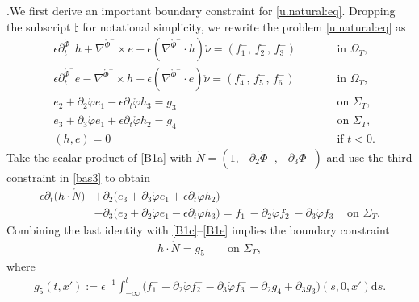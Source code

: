 \documentclass[twoside,11pt]{article}
\numberwithin{equation}{section}
\def\p{\partial}
\begin{document}
\vspace*{2mm}
.\quad We first derive an important boundary constraint for \eqref{u.natural:eq}.
Dropping the subscript $\natural$ for notational simplicity,
we rewrite the problem \eqref{u.natural:eq} as
\begin{subequations} \label{B1}
	\begin{alignat}{3}
		\label{B1a}
		&\epsilon \p_t^{\mathring{\Phi}^-}h+\nabla^{\mathring{\Phi}^-}\times e+\epsilon   (\nabla^{\mathring{\Phi}^-}\cdot h) \mathring{\nu}= (f_1^-,\, f_2^-,\, f_3^-)
		&\qquad &  \textrm{in } \Omega_T,\\[0.5mm]
		\label{B1b}
		& \epsilon \p_t^{\mathring{\Phi}^-}e-\nabla^{\mathring{\Phi}^-}\times h+\epsilon  ( \nabla^{\mathring{\Phi}^-}\cdot e )\mathring{\nu}=(f_4^-,\, f_5^-,\, f_6^-)
		&& \textrm{in }\Omega_T,\\[0.5mm]
		\label{B1c}
	& e_2+\p_2\mathring{\varphi}e_1-\epsilon \p_t\mathring{\varphi} h_3=g_3
&\quad  &\textrm{on } \Sigma_T,\\[0.5mm]
		\label{B1d}
& e_3+\p_3\mathring{\varphi}e_1+\epsilon \p_t\mathring{\varphi} h_2=g_4
&\quad  &\textrm{on } \Sigma_T,\\[0.5mm]
		\label{B1e}
		&
		(h, e) =0   &&\textrm{if } t<0.
	\end{alignat}
\end{subequations}
Take the scalar product of \eqref{B1a} with $\mathring{N}=(1,-\p_2\mathring{\Phi}^-,-\p_3\mathring{\Phi}^-)$
and use the third constraint in \eqref{bas3} to obtain
\begin{align}\nonumber
\epsilon \p_t\big(h\cdot \mathring{N}\big)
&	+\p_2\big(e_3 +\p_3\mathring{\varphi}e_1+\epsilon \p_t\mathring{\varphi} h_2\big)
\\[0.5mm]
&	-\p_3\big(e_2+\p_2\mathring{\varphi}e_1-\epsilon \p_t\mathring{\varphi} h_3 \big)
=f_1^--\p_2\mathring{\varphi}f_2^- -\p_3\mathring{\varphi}f_3^-
	\quad\textrm{on } \Sigma_{T}.
		\label{B:id1}
\end{align}
Combining the last identity with \eqref{B1c}--\eqref{B1e} implies the boundary constraint
\begin{align}
	\label{B:con1}
	h\cdot \mathring{N} =g_5
	\qquad\textrm{on } \Sigma_{T},
\end{align}
where
\begin{align} \label{g4:def}
	g_5(t,x'):=\epsilon^{-1}\int_{-\infty}^{t}\big(f_1^- -\p_2\mathring{\varphi}f_2^-
	-\p_3\mathring{\varphi}f_3^-
	 -\p_2 g_4+\p_3 g_3\big)(s,0, x')\mathrm{d}s.
\end{align}
\end{document}
